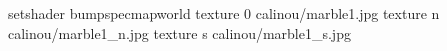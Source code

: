 setshader bumpspecmapworld
texture 0 calinou/marble1.jpg
texture n calinou/marble1_n.jpg
texture s calinou/marble1_s.jpg
